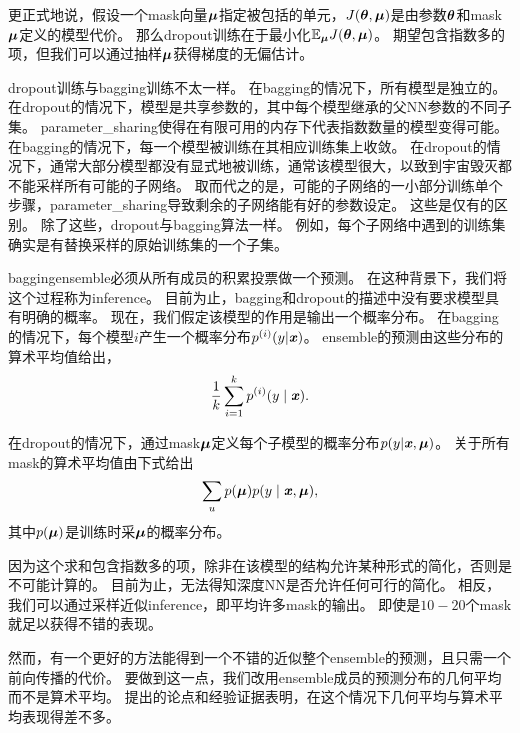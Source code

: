 更正式地说，假设一个\gls{mask}向量$\boldsymbol{\mu}$指定被包括的单元，$J(\boldsymbol{\theta}, \boldsymbol{\mu})$是由参数$\boldsymbol{\theta}$和\gls{mask}$\boldsymbol{\mu}$定义的模型代价。
那么\gls{dropout}训练在于最小化$\mathbb{E}_{\boldsymbol{\mu}} J(\boldsymbol{\theta}, \boldsymbol{\mu})$。 
期望包含指数多的项，但我们可以通过抽样$\boldsymbol{\mu}$获得梯度的无偏估计。

\gls{dropout}训练与\gls{bagging}训练不太一样。
在\gls{bagging}的情况下，所有模型是独立的。
在\gls{dropout}的情况下，模型是共享参数的，其中每个模型继承的父\gls{NN}参数的不同子集。
\gls{parameter_sharing}使得在有限可用的内存下代表指数数量的模型变得可能。
在\gls{bagging}的情况下，每一个模型被训练在其相应训练集上收敛。
在\gls{dropout}的情况下，通常大部分模型都没有显式地被训练，通常该模型很大，以致到宇宙毁灭都不能采样所有可能的子网络。
取而代之的是，可能的子网络的一小部分训练单个步骤，\gls{parameter_sharing}导致剩余的子网络能有好的参数设定。
这些是仅有的区别。
除了这些，\gls{dropout}与\gls{bagging}算法一样。
例如，每个子网络中遇到的训练集确实是有替换采样的原始训练集的一个子集。

\gls{bagging}\gls{ensemble}必须从所有成员的积累投票做一个预测。
在这种背景下，我们将这个过程称为\gls{inference}。
目前为止，\gls{bagging}和\gls{dropout}的描述中没有要求模型具有明确的概率。
现在，我们假定该模型的作用是输出一个概率分布。
在\gls{bagging}的情况下，每个模型$i$产生一个概率分布$p^{(i)}(y | \boldsymbol{\mathit{x}})$。 
\gls{ensemble}的预测由这些分布的算术平均值给出，
\begin{align}
 \frac{1}{k} \sum_{i=1}^k p^{(i)}(y \mid \boldsymbol{\mathit{x}}).
\end{align}

在\gls{dropout}的情况下，通过\gls{mask}$\boldsymbol{\mu}$定义每个子模型的概率分布$p(y | \boldsymbol{\mathit{x}}, \boldsymbol{\mu})$。
关于所有\gls{mask}的算术平均值由下式给出
\begin{align}
  \sum_{u} p(\boldsymbol{\mu}) p(y \mid \boldsymbol{\mathit{x}}, \boldsymbol{\mu}),
\end{align}
其中$p(\boldsymbol{\mu})$是训练时采$\boldsymbol{\mu}$的概率分布。


因为这个求和包含指数多的项，除非在该模型的结构允许某种形式的简化，否则是不可能计算的。
目前为止，无法得知深度\gls{NN}是否允许任何可行的简化。
相反，我们可以通过采样近似\gls{inference}，即平均许多\gls{mask}的输出。
即使是$10-20$个\gls{mask}就足以获得不错的表现。

然而，有一个更好的方法能得到一个不错的近似整个\gls{ensemble}的预测，且只需一个前向传播的代价。
要做到这一点，我们改用\gls{ensemble}成员的预测分布的几何平均而不是算术平均。
\cite{WardeFarley+al-ICLR2014}提出的论点和经验证据表明，在这个情况下几何平均与算术平均表现得差不多。

